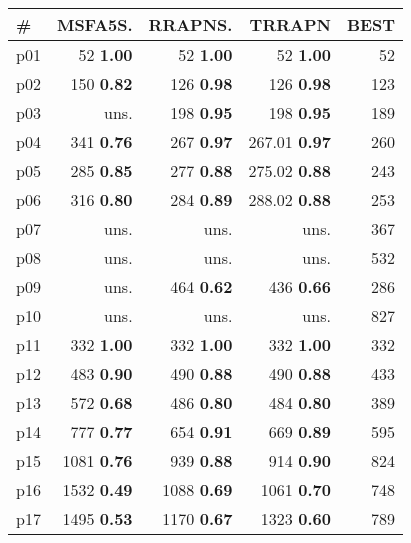 \begin{tabular}{|l|rrr|r|}
\hline
\textbf{\#} & \textbf{MSFA5S.} & \textbf{RRAPNS.} & \textbf{TRRAPN} & \textbf{BEST}\\
\hline
p01 & {\footnotesize 52} \textbf{1.00} & {\footnotesize 52} \textbf{1.00} & {\footnotesize 52} \textbf{1.00} & 52\\
p02 & {\footnotesize 150} \textbf{0.82} & {\footnotesize 126} \textbf{0.98} & {\footnotesize 126} \textbf{0.98} & 123\\
p03 & uns. & {\footnotesize 198} \textbf{0.95} & {\footnotesize 198} \textbf{0.95} & 189\\
p04 & {\footnotesize 341} \textbf{0.76} & {\footnotesize 267} \textbf{0.97} & {\footnotesize 267.01} \textbf{0.97} & 260\\
p05 & {\footnotesize 285} \textbf{0.85} & {\footnotesize 277} \textbf{0.88} & {\footnotesize 275.02} \textbf{0.88} & 243\\
p06 & {\footnotesize 316} \textbf{0.80} & {\footnotesize 284} \textbf{0.89} & {\footnotesize 288.02} \textbf{0.88} & 253\\
p07 & uns. & uns. & uns. & 367\\
p08 & uns. & uns. & uns. & 532\\
p09 & uns. & {\footnotesize 464} \textbf{0.62} & {\footnotesize 436} \textbf{0.66} & 286\\
p10 & uns. & uns. & uns. & 827\\
p11 & {\footnotesize 332} \textbf{1.00} & {\footnotesize 332} \textbf{1.00} & {\footnotesize 332} \textbf{1.00} & 332\\
p12 & {\footnotesize 483} \textbf{0.90} & {\footnotesize 490} \textbf{0.88} & {\footnotesize 490} \textbf{0.88} & 433\\
p13 & {\footnotesize 572} \textbf{0.68} & {\footnotesize 486} \textbf{0.80} & {\footnotesize 484} \textbf{0.80} & 389\\
p14 & {\footnotesize 777} \textbf{0.77} & {\footnotesize 654} \textbf{0.91} & {\footnotesize 669} \textbf{0.89} & 595\\
p15 & {\footnotesize 1081} \textbf{0.76} & {\footnotesize 939} \textbf{0.88} & {\footnotesize 914} \textbf{0.90} & 824\\
p16 & {\footnotesize 1532} \textbf{0.49} & {\footnotesize 1088} \textbf{0.69} & {\footnotesize 1061} \textbf{0.70} & 748\\
p17 & {\footnotesize 1495} \textbf{0.53} & {\footnotesize 1170} \textbf{0.67} & {\footnotesize 1323} \textbf{0.60} & 789\\

\end{tabular}
